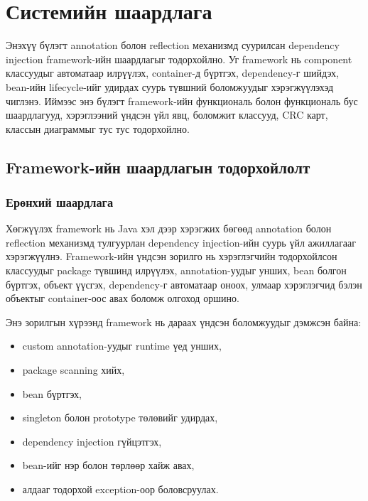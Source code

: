\chapter{Системийн шаардлага}

Энэхүү бүлэгт annotation болон reflection механизмд суурилсан dependency injection framework-ийн шаардлагыг тодорхойлно. Уг framework нь component классуудыг автоматаар илрүүлэх, container-д бүртгэх, dependency-г шийдэх, bean-ийн lifecycle-ийг удирдах суурь түвшний боломжуудыг хэрэгжүүлэхэд чиглэнэ. Иймээс энэ бүлэгт framework-ийн функциональ болон функциональ бус шаардлагууд, хэрэглээний үндсэн үйл явц, боломжит классууд, CRC карт, классын диаграммыг тус тус тодорхойлно.

\section{Framework-ийн шаардлагын тодорхойлолт}

\subsection{Ерөнхий шаардлага}

Хөгжүүлэх framework нь Java хэл дээр хэрэгжих бөгөөд annotation болон reflection механизмд тулгуурлан dependency injection-ийн суурь үйл ажиллагааг хэрэгжүүлнэ. Framework-ийн үндсэн зорилго нь хэрэглэгчийн тодорхойлсон классуудыг package түвшинд илрүүлэх, annotation-уудыг унших, bean болгон бүртгэх, объект үүсгэх, dependency-г автоматаар оноох, улмаар хэрэглэгчид бэлэн объектыг container-оос авах боломж олгоход оршино.

Энэ зорилгын хүрээнд framework нь дараах үндсэн боломжуудыг дэмжсэн байна:
\begin{itemize}
    \item custom annotation-уудыг runtime үед унших,
    \item package scanning хийх,
    \item bean бүртгэх,
    \item singleton болон prototype төлөвийг удирдах,
    \item dependency injection гүйцэтгэх,
    \item bean-ийг нэр болон төрлөөр хайж авах,
    \item алдааг тодорхой exception-оор боловсруулах.
\end{itemize}

